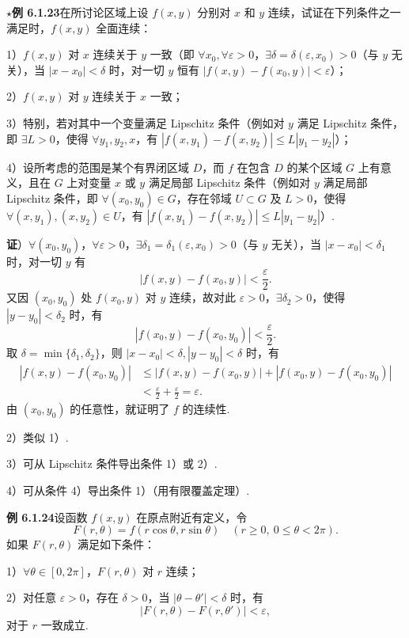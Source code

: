 \documentclass[UTF8, 12pt, fontset=fandol, oneside]{ctexart}
\begin{document}
\noindent\textbf{$\star$例 6.1.23}\quad 在所讨论区域上设 $f(x,y)$ 分别对 $x$ 和 $y$ 连续，试证在下列条件之一满足时，$f(x,y)$ 全面连续：

1）$f(x,y)$ 对 $x$ 连续关于 $y$ 一致（即 $\forall x_0,\forall\varepsilon>0$，$\exists\delta=\delta(\varepsilon,x_0)>0$（与 $y$ 无关），当 $|x-x_0|<\delta$ 时，对一切 $y$ 恒有 $|f(x,y)-f(x_0,y)|<\varepsilon$）；

2）$f(x,y)$ 对 $y$ 连续关于 $x$ 一致；

3）特别，若对其中一个变量满足 Lipschitz 条件（例如对 $y$ 满足 Lipschitz 条件，即 $\exists L>0$，使得 $\forall y_1,y_2,x$，有 $|f(x,y_1)-f(x,y_2)|\le L|y_1-y_2|$）；

4）设所考虑的范围是某个有界闭区域 $D$，而 $f$ 在包含 $D$ 的某个区域 $G$ 上有意义，且在 $G$ 上对变量 $x$ 或 $y$ 满足局部 Lipschitz 条件（例如对 $y$ 满足局部 Lipschitz 条件，即 $\forall(x_0,y_0)\in G$，存在邻域 $U\subset G$ 及 $L>0$，使得 $\forall(x,y_1),(x,y_2)\in U$，有 $|f(x,y_1)-f(x,y_2)|\le L|y_1-y_2|$）.

\noindent\textbf{证}）$\forall(x_0,y_0)$，$\forall\varepsilon>0$，$\exists\delta_1=\delta_1(\varepsilon,x_0)>0$（与 $y$ 无关），当 $|x-x_0|<\delta_1$ 时，对一切 $y$ 有
\[
  |f(x,y)-f(x_0,y)|<\frac{\varepsilon}{2}.
\]
又因 $(x_0,y_0)$ 处 $f(x_0,y)$ 对 $y$ 连续，故对此 $\varepsilon>0$，$\exists\delta_2>0$，使得 $|y-y_0|<\delta_2$ 时，有
\[
  |f(x_0,y)-f(x_0,y_0)|<\frac{\varepsilon}{2}.
\]
取 $\delta=\min\{\delta_1,\delta_2\}$，则 $|x-x_0|<\delta,|y-y_0|<\delta$ 时，有
\[
\begin{aligned}
|f(x,y)-f(x_0,y_0)|
&\le |f(x,y)-f(x_0,y)|+|f(x_0,y)-f(x_0,y_0)|\\
&<\frac{\varepsilon}{2}+\frac{\varepsilon}{2}=\varepsilon.
\end{aligned}
\]
由 $(x_0,y_0)$ 的任意性，就证明了 $f$ 的连续性.

2）类似 1）.

3）可从 Lipschitz 条件导出条件 1）或 2）.

4）可从条件 4）导出条件 1）（用有限覆盖定理）.

\noindent\textbf{例 6.1.24}\quad 设函数 $f(x,y)$ 在原点附近有定义，令
\[
  F(r,\theta)=f(r\cos\theta,r\sin\theta)\quad(r\ge0,\ 0\le\theta<2\pi).
\]
如果 $F(r,\theta)$ 满足如下条件：

1）$\forall\theta\in[0,2\pi]$，$F(r,\theta)$ 对 $r$ 连续；

2）对任意 $\varepsilon>0$，存在 $\delta>0$，当 $|\theta-\theta'|<\delta$ 时，有
\[
  |F(r,\theta)-F(r,\theta')|<\varepsilon,
\]
对于 $r$ 一致成立.
\end{document}
